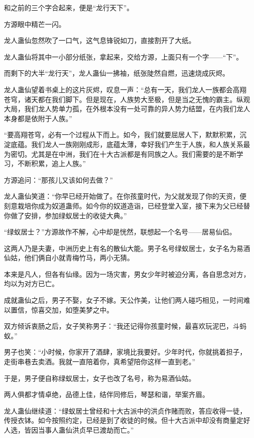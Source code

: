 \begin{this_body}
和之前的三个字合起来，便是“龙行天下”。

方源眼中精芒一闪。

龙人蛊仙忽然吹了一口气，这气息锋锐如刀，直接割开了大纸。

龙人蛊仙将其中一小部分纸张，拿起来，交给方源，上面只有一个字——“下”。

而剩下的大半“龙行天”，龙人蛊仙一拂袖，纸张陡然自燃，迅速烧成灰烬。

龙人蛊仙望着书桌上的这片灰烬，叹息一声：“总有一天，我们龙人一族都会高翔苍穹，诸天都在我们脚下。但是现在，人族势大至极，但是当之无愧的霸主。纵观大局，我们龙人势单力孤，在外根本没有一处可靠的异人势力结盟，在内我们龙人本身都是依附于人族。”

“要高翔苍穹，必有一个过程从下而上。如今，我们就要屈居人下，默默积累，沉淀底蕴。我们龙人一族刚刚成形，底蕴太薄，幸好我们产生于人族，和人族关系最为密切。尤其是在中洲，我们在十大古派都是有同族之人。我们需要的是不断学习，不断积累，追上人族。”

方源追问：“那孩儿又该如何去做？”

龙人蛊仙笑道：“你早已经开始做了。在你孩童时代，为父就发现了你的天资，便刻意栽培你成为奴道蛊师。如今你的奴道造诣，已经登堂入室，接下来为父已经替你做了安排，参加绿蚁居士的收徒大典。”

“绿蚁居士？”方源故作不解，心中却是恍然，联想起一个名号——居易仙侣。

这两人乃是夫妻，中洲历史上有名的散仙大能。男子名号绿蚁居士，女子名为易酒仙姑，他们俩自小就青梅竹马，两小无猜。

本来是凡人，但各有仙缘。因为一场灾害，男女少年时被迫分离，各自思念对方，均以为对方已亡。

成就蛊仙之后，男子不娶，女子不嫁。天公作美，让他们两人碰巧相见，一时间难以置信，惊喜交加，如堕美梦之中。

双方倾诉衷肠之后，女子笑称男子：“我还记得你孩童时候，最喜欢玩泥巴，斗蚂蚁。”

男子也笑：“小时候，你家开了酒肆，家境比我要好。少年时代，你就挑着担子，走街串巷去卖酒。我就一直陪着你，真希望陪你这样一直到老。”

于是，男子便自称绿蚁居士，女子也改了名号，称为易酒仙姑。

两人俱都才情卓绝，品德上佳，结伴同修后，琴瑟和谐，举案齐眉。

龙人蛊仙继续道：“绿蚁居士曾经和十大古派中的洪贞作赌而败，答应收得一徒，传授衣钵。如今按照约定，已经是到了收徒的时候。但十大古派中却没有商量定好人选，皆因当事人蛊仙洪贞早已渡劫而亡。”


\end{this_body}
